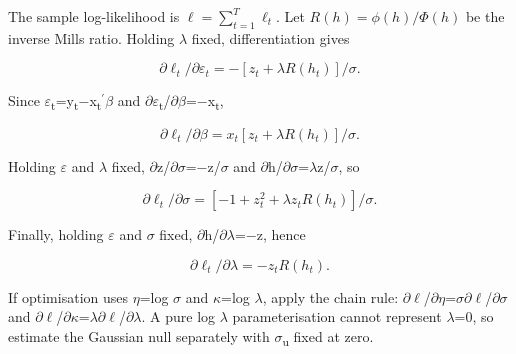 The sample log-likelihood is $\ell=\sum_{t=1}^{T}\ell_t$. Let
$R(h)=\phi(h)/\Phi(h)$ be the inverse Mills ratio. Holding $\lambda$ fixed,
differentiation gives

\begin{equation}
\partial \ell _{t}/\partial \varepsilon _{t} = -[z_{t}+\lambda R(h_{t})]/\sigma .
\end{equation}

Since \ensuremath{\varepsilon }\textsubscript{t}=y\textsubscript{t}\ensuremath{-}x\textsubscript{t}\ensuremath{{}^{\prime}}\ensuremath{\beta } and
\ensuremath{\partial }\ensuremath{\varepsilon }\textsubscript{t}/\ensuremath{\partial }\ensuremath{\beta }=\ensuremath{-}x\textsubscript{t},

\begin{equation}
\partial \ell _{t}/\partial \beta  = x_{t}[z_{t}+\lambda R(h_{t})]/\sigma .
\end{equation}

Holding \ensuremath{\varepsilon } and \ensuremath{\lambda } fixed, \ensuremath{\partial }z/\ensuremath{\partial }\ensuremath{\sigma }=\ensuremath{-}z/\ensuremath{\sigma } and \ensuremath{\partial }h/\ensuremath{\partial }\ensuremath{\sigma }=\ensuremath{\lambda }z/\ensuremath{\sigma }, so

\begin{equation}
\partial \ell _{t}/\partial \sigma  = [-1+z_{t}^{2}+\lambda z_{t}R(h_{t})]/\sigma .
\end{equation}

Finally, holding \ensuremath{\varepsilon } and \ensuremath{\sigma } fixed, \ensuremath{\partial }h/\ensuremath{\partial }\ensuremath{\lambda }=\ensuremath{-}z, hence

\begin{equation}
\partial \ell _{t}/\partial \lambda  = -z_{t}R(h_{t}).
\end{equation}

If optimisation uses \ensuremath{\eta }=log \ensuremath{\sigma } and \ensuremath{\kappa }=log \ensuremath{\lambda }, apply the chain rule:
\ensuremath{\partial }\ensuremath{\ell }/\ensuremath{\partial }\ensuremath{\eta }=\ensuremath{\sigma }\ensuremath{\partial }\ensuremath{\ell }/\ensuremath{\partial }\ensuremath{\sigma } and \ensuremath{\partial }\ensuremath{\ell }/\ensuremath{\partial }\ensuremath{\kappa }=\ensuremath{\lambda }\ensuremath{\partial }\ensuremath{\ell }/\ensuremath{\partial }\ensuremath{\lambda }. A pure log \ensuremath{\lambda } parameterisation cannot
represent \ensuremath{\lambda }=0, so estimate the Gaussian null separately with
\ensuremath{\sigma }\textsubscript{u} fixed at zero.

